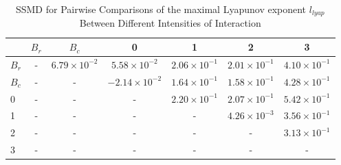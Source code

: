 \begin{table*}[!t]
\caption{SSMD for Pairwise Comparisons of the maximal Lyapunov exponent $l_{lyap}$ Between Different Intensities of Interaction\label{tab:ssmd_lyapunov}}
\centering
\begin{tabular}{lcccccc}
\toprule
 & $B_r$ & $B_c$ & 0 & 1 & 2 & 3 \\
\midrule
$B_r$ & - & $6.79 \times 10^{-2}$ & $5.58 \times 10^{-2}$ & $2.06 \times 10^{-1}$ & $2.01 \times 10^{-1}$ & $4.10 \times 10^{-1}$ \\
$B_c$ & - & - & $-2.14 \times 10^{-2}$ & $1.64 \times 10^{-1}$ & $1.58 \times 10^{-1}$ & $4.28 \times 10^{-1}$ \\
0 & - & - & - & $2.20 \times 10^{-1}$ & $2.07 \times 10^{-1}$ & $5.42 \times 10^{-1}$ \\
1 & - & - & - & - & $4.26 \times 10^{-3}$ & $3.56 \times 10^{-1}$ \\
2 & - & - & - & - & - & $3.13 \times 10^{-1}$ \\
3 & - & - & - & - & - & - \\
\bottomrule
\end{tabular}
\end{table*}
